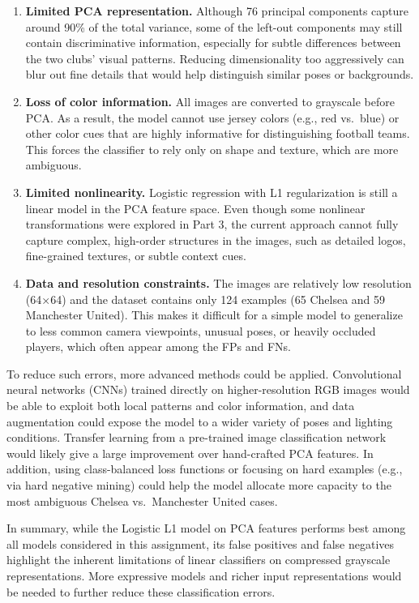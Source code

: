 \documentclass[
]{article}
\begin{document}
\begin{enumerate}
\def\labelenumi{\arabic{enumi}.}
\item
  \textbf{Limited PCA representation.} Although 76 principal components
  capture around 90\% of the total variance, some of the left-out
  components may still contain discriminative information, especially
  for subtle differences between the two clubs' visual patterns.
  Reducing dimensionality too aggressively can blur out fine details
  that would help distinguish similar poses or backgrounds.
\item
  \textbf{Loss of color information.} All images are converted to
  grayscale before PCA. As a result, the model cannot use jersey colors
  (e.g., red vs.~blue) or other color cues that are highly informative
  for distinguishing football teams. This forces the classifier to rely
  only on shape and texture, which are more ambiguous.
\item
  \textbf{Limited nonlinearity.} Logistic regression with L1
  regularization is still a linear model in the PCA feature space. Even
  though some nonlinear transformations were explored in Part 3, the
  current approach cannot fully capture complex, high-order structures
  in the images, such as detailed logos, fine-grained textures, or
  subtle context cues.
\item
  \textbf{Data and resolution constraints.} The images are relatively
  low resolution (64×64) and the dataset contains only 124 examples (65
  Chelsea and 59 Manchester United). This makes it difficult for a
  simple model to generalize to less common camera viewpoints, unusual
  poses, or heavily occluded players, which often appear among the FPs
  and FNs.
\end{enumerate}

To reduce such errors, more advanced methods could be applied.
Convolutional neural networks (CNNs) trained directly on
higher-resolution RGB images would be able to exploit both local
patterns and color information, and data augmentation could expose the
model to a wider variety of poses and lighting conditions. Transfer
learning from a pre-trained image classification network would likely
give a large improvement over hand-crafted PCA features. In addition,
using class-balanced loss functions or focusing on hard examples (e.g.,
via hard negative mining) could help the model allocate more capacity to
the most ambiguous Chelsea vs.~Manchester United cases.

In summary, while the Logistic L1 model on PCA features performs best
among all models considered in this assignment, its false positives and
false negatives highlight the inherent limitations of linear classifiers
on compressed grayscale representations. More expressive models and
richer input representations would be needed to further reduce these
classification errors.
\end{document}
